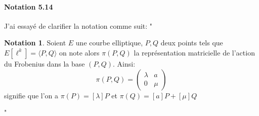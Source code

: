\documentclass[10pt,a4paper]{article}
\theoremstyle{plain}
\theoremstyle{definition}
\theoremstyle{definition}
\theoremstyle{definition}
\theoremstyle{definition}
\theoremstyle{definition}
\theoremstyle{remark}
\theoremstyle{remark}
\theoremstyle{definition}
\newtheorem{nota}[thm]{Notation}
\begin{document}
\paragraph{Notation 5.14}{J'ai essayé de clarifier la notation comme suit: "
\begin{nota} 
Soient $E$ une courbe elliptique, $P,Q$ deux points tels que $E[\ell^k]=\langle
P,Q \rangle$ on note alors $\pi(P,Q)$ la représentation matricielle de l'action
du Frobenius dans la base $(P,Q)$. Ainsi:
\[
\pi(P,Q)=\left(
\begin{matrix}
\lambda & a \\
0 & \mu
\end{matrix}
 \right)
\]
signifie que l'on a $\pi(P)=[\lambda]P$ et $\pi(Q)=[a]P+[\mu]Q$
\end{nota}"}


\end{document}

